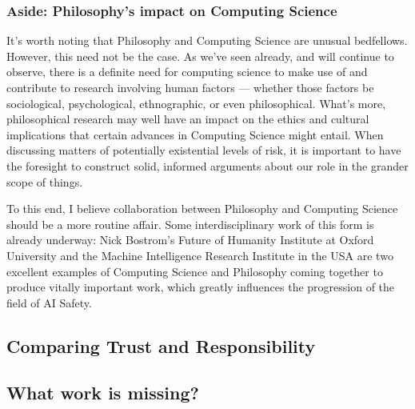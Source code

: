 
\subsubsection{Aside: Philosophy's impact on Computing Science}
It's worth noting that Philosophy and Computing Science are unusual bedfellows. However, this need not be the case. As we've seen already, and will continue to observe, there is a definite need for computing science to make use of and contribute to research involving human factors --- whether those factors be sociological, psychological, ethnographic, or even philosophical. What's more, philosophical research may well have an impact on the ethics and cultural implications that certain advances in Computing Science might entail. When discussing matters of potentially existential levels of risk, it is important to have the foresight to construct solid, informed arguments about our role in the grander scope of things.\par

To this end, I believe collaboration between Philosophy and Computing Science should be a more routine affair. Some interdisciplinary work of this form is already underway: Nick Bostrom's Future of Humanity Institute at Oxford University and the Machine Intelligence Research Institute in the USA are two excellent examples of Computing Science and Philosophy coming together to produce vitally important work, which greatly influences the progression of the field of AI Safety.\par


\subsection{Comparing Trust and Responsibility}


\subsection{What work is missing?}


